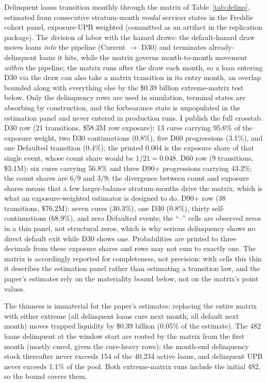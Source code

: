 \documentclass[12pt]{article}
\begin{document}
Delinquent loans transition monthly through the matrix of Table~\ref{tab:delinq}, estimated from consecutive stratum-month \emph{modal} servicer states in the Freddie cohort panel, exposure-UPB weighted (committed as an artifact in the replication package). The division of labor with the hazard draws: the default-hazard draw moves loans \emph{into} the pipeline (Current $\to$ D30) and terminates already-delinquent loans it hits, while the matrix governs month-to-month movement \emph{within} the pipeline; the matrix runs after the draw each month, so a loan entering D30 via the draw can also take a matrix transition in its entry month, an overlap bounded along with everything else by the \$0.39 billion extreme-matrix test below. Only the delinquency rows are used in simulation, terminal states are absorbing by construction, and the forbearance state is unpopulated in the estimation panel and never entered in production runs.
I publish the full crosstab. D30 row (21 transitions, \$58.3M row exposure): 13 cures carrying 95.6\% of the exposure weight, two D30 continuations (0.8\%), five D60 progressions (3.1\%), and one Defaulted transition (0.4\%); the printed 0.004 is the exposure share of that single event, whose count share would be $1/21 = 0.048$. D60 row (9 transitions, \$3.1M): six cures carrying 56.8\% and three D90+ progressions carrying 43.2\%; the count shares are $6/9$ and $3/9$; the divergence between count and exposure shares means that a few larger-balance stratum-months drive the matrix, which is what an exposure-weighted estimator is designed to do. D90+ row (38 transitions, \$76.2M): seven cures (30.3\%), one D30 (0.8\%), thirty self-continuations (68.9\%), and zero Defaulted events; the ``--'' cells are observed zeros in a thin panel, not structural zeros, which is why serious delinquency shows no direct default exit while D30 shows one. Probabilities are printed to three decimals from these exposure shares and rows may not sum to exactly one. The matrix is accordingly reported for completeness, not precision: with cells this thin it describes the estimation panel rather than estimating a transition law, and the paper's estimates rely on the materiality bound below, not on the matrix's point values.

The thinness is immaterial for the paper's estimates: replacing the entire matrix with either extreme (all delinquent loans cure next month; all default next month) moves trapped liquidity by \$0.39 billion (0.05\% of the estimate). The 482 loans delinquent at the window start are routed by the matrix from the first month (mostly cured, given the cure-heavy rows); the month-end delinquency stock thereafter never exceeds 154 of the 40,234 active loans, and delinquent UPB never exceeds 1.1\% of the pool. Both extreme-matrix runs include the initial 482, so the bound covers them.
\end{document}
